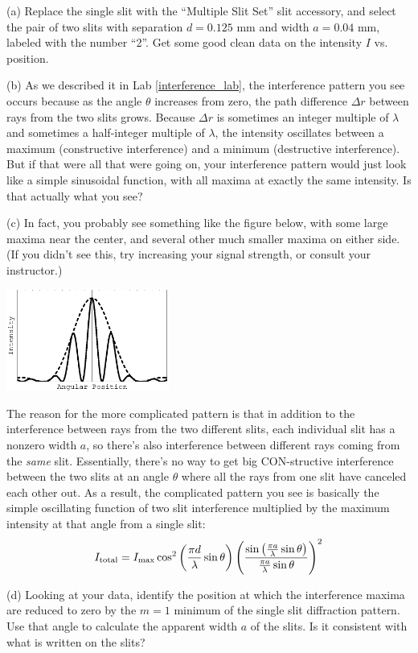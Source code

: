 (a) Replace the single slit with the ``Multiple Slit Set'' slit accessory, and select the pair of two slits with separation $d=0.125$ mm and width $a=0.04$ mm, labeled with the number ``2''.  Get some good clean data on the intensity $I$ vs. position.

(b) As we described it in Lab \ref{interference_lab}, the interference pattern you see occurs because as the angle $\theta$ increases from zero, the path difference $\Delta r$ between rays from the two slits grows.  Because $\Delta r$ is sometimes an integer multiple of $\lambda$ and sometimes a half-integer multiple of $\lambda$, the intensity oscillates between a maximum (constructive interference) and a minimum (destructive interference).  But if that were all that were going on, your interference pattern would just look like a simple sinusoidal function, with all maxima at exactly the same intensity.  Is that actually what you see?
\answerspace{0.4in}

(c) In fact, you probably see something like the figure below, with some large maxima near the center, and several other much smaller maxima on either side.  (If you didn't see this, try increasing your signal strength, or consult your instructor.)

\vspace{-0.1in}
\begin{center}
\includegraphics[width=0.4\textwidth]{diffraction_of_light/diffraction_of_light_fig_4.eps}
\end{center}
\vspace{-0.1in}

The reason for the more complicated pattern is that in addition to the interference between rays from the two different slits, each individual slit has a nonzero width $a$, so there's also interference between different rays coming from the \textit{same} slit.  Essentially, there's no way to get big CON-structive interference between the two slits at an angle $\theta$ where all the rays from one slit have canceled each other out.  As a result, the complicated pattern you see is basically the simple oscillating function of two slit interference multiplied by the maximum intensity at that angle from a single slit: 
\begin{displaymath} 
I_{\rm{total}} = I_{\rm{max}} \cos^2 \left (\frac {\pi d} {\lambda} \sin \theta \right) \left(\frac {\sin \left (\frac {\pi a} {\lambda} \sin \theta \right )} {\frac {\pi a} {\lambda} \sin \theta} \right)^2 \end{displaymath}

(d) Looking at your data, identify the position at which the interference maxima  are reduced to zero by the $m=1$ minimum of the single slit diffraction pattern.  Use that angle to calculate the apparent width $a$ of the slits.  Is it consistent with what is written on the slits?
\answerspace{1in}
